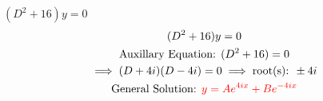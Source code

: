 \item [6.] $(D^2+16)y=0$
\begin{gather*}
    (D^2+16)y=0\\
    \text{Auxillary Equation: }(D^2+16)=0\\
    \implies (D+4i)(D-4i)=0 \implies \text{root(s): } \pm 4i\\
    \text{General Solution: } \textcolor{red}{y=Ae^{4ix}+Be^{-4ix}}
\end{gather*}